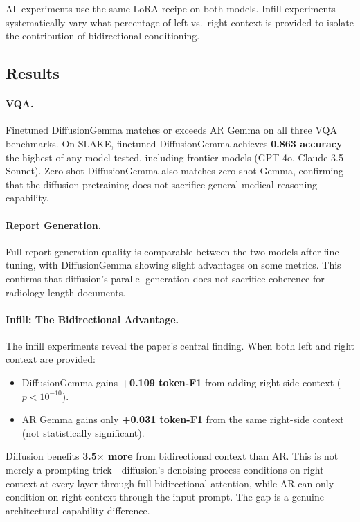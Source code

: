 \documentclass[11pt,a4paper]{article}
\begin{document}
All experiments use the same LoRA recipe on both models. Infill experiments systematically vary what percentage of left vs.\ right context is provided to isolate the contribution of bidirectional conditioning.

\subsection{Results}

\paragraph{VQA.} Finetuned DiffusionGemma matches or exceeds AR Gemma on all three VQA benchmarks. On SLAKE, finetuned DiffusionGemma achieves \textbf{0.863 accuracy}---the highest of any model tested, including frontier models (GPT-4o, Claude 3.5 Sonnet). Zero-shot DiffusionGemma also matches zero-shot Gemma, confirming that the diffusion pretraining does not sacrifice general medical reasoning capability.

\paragraph{Report Generation.} Full report generation quality is comparable between the two models after fine-tuning, with DiffusionGemma showing slight advantages on some metrics. This confirms that diffusion's parallel generation does not sacrifice coherence for radiology-length documents.

\paragraph{Infill: The Bidirectional Advantage.} The infill experiments reveal the paper's central finding. When both left and right context are provided:
\begin{itemize}
\item DiffusionGemma gains \textbf{+0.109 token-F1} from adding right-side context ($p < 10^{-10}$).
\item AR Gemma gains only \textbf{+0.031 token-F1} from the same right-side context (not statistically significant).
\end{itemize}
Diffusion benefits \textbf{3.5$\times$ more} from bidirectional context than AR. This is not merely a prompting trick---diffusion's denoising process conditions on right context at every layer through full bidirectional attention, while AR can only condition on right context through the input prompt. The gap is a genuine architectural capability difference.
\end{document}
